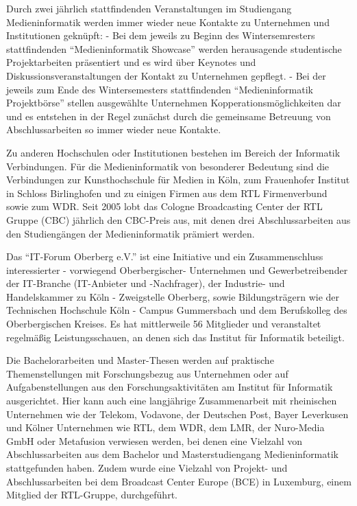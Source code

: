 Durch zwei jährlich stattfindenden Veranstaltungen im Studiengang
Medieninformatik werden immer wieder neue Kontakte zu Unternehmen und
Institutionen geknüpft: - Bei dem jeweils zu Beginn des Wintersemresters
stattfindenden ``Medieninformatik Showcase'' werden herausagende
studentische Projektarbeiten präsentiert und es wird über Keynotes und
Diskussionsveranstaltungen der Kontakt zu Unternehmen gepflegt. - Bei
der jeweils zum Ende des Wintersemesters stattfindenden
``Medieninformatik Projektbörse'' stellen ausgewählte Unternehmen
Kopperationsmöglichkeiten dar und es entstehen in der Regel zunächst
durch die gemeinsame Betreuung von Abschlussarbeiten so immer wieder
neue Kontakte.

Zu anderen Hochschulen oder Institutionen bestehen im Bereich der
Informatik Verbindungen. Für die Medieninformatik von besonderer
Bedeutung sind die Verbindungen zur Kunsthochschule für Medien in Köln,
zum Frauenhofer Institut in Schloss Birlinghofen und zu einigen Firmen
aus dem RTL Firmenverbund sowie zum WDR. Seit 2005 lobt das Cologne
Broadcasting Center der RTL Gruppe (CBC) jährlich den CBC-Preis aus, mit
denen drei Abschlussarbeiten aus den Studiengängen der Medieninformatik
prämiert werden.

Das ``IT-Forum Oberberg e.V.'' ist eine Initiative und ein
Zusammenschluss interessierter - vorwiegend Oberbergischer- Unternehmen
und Gewerbetreibender der IT-Branche (IT-Anbieter und -Nachfrager), der
Industrie- und Handelskammer zu Köln - Zweigstelle Oberberg, sowie
Bildungsträgern wie der Technischen Hochschule Köln - Campus Gummersbach
und dem Berufskolleg des Oberbergischen Kreises. Es hat mittlerweile 56
Mitglieder und veranstaltet regelmäßig Leistungsschauen, an denen sich
das Institut für Informatik beteiligt.

Die Bachelorarbeiten und Master-Thesen werden auf praktische
Themenstellungen mit Forschungsbezug aus Unternehmen oder auf
Aufgabenstellungen aus den Forschungsaktivitäten am Institut für
Informatik ausgerichtet. Hier kann auch eine langjährige Zusammenarbeit
mit rheinischen Unternehmen wie der Telekom, Vodavone, der Deutschen
Post, Bayer Leverkusen und Kölner Unternehmen wie RTL, dem WDR, dem LMR,
der Nuro-Media GmbH oder Metafusion verwiesen werden, bei denen eine
Vielzahl von Abschlussarbeiten aus dem Bachelor und Masterstudiengang
Medieninformatik stattgefunden haben. Zudem wurde eine Vielzahl von
Projekt- und Abschlussarbeiten bei dem Broadcast Center Europe (BCE) in
Luxemburg, einem Mitglied der RTL-Gruppe, durchgeführt.

